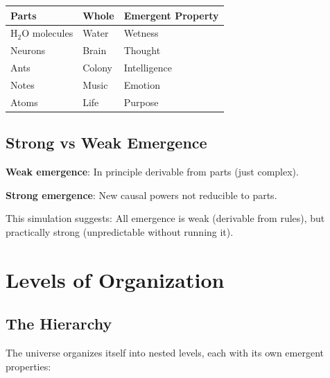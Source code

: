 \documentclass[
  11pt,
  letterpaper,
  twoside,
  openright]{book}
\begin{document}
\begin{longtable}[]{@{}lll@{}}
\toprule\noalign{}
Parts & Whole & Emergent Property \\
\midrule\noalign{}
\endhead
\bottomrule\noalign{}
\endlastfoot
\(\text{H}_2\text{O}\) molecules & Water & Wetness \\
Neurons & Brain & Thought \\
Ants & Colony & Intelligence \\
Notes & Music & Emotion \\
Atoms & Life & Purpose \\
\end{longtable}

\subsection{Strong vs Weak Emergence}\label{strong-vs-weak-emergence}

\textbf{Weak emergence}: In principle derivable from parts (just
complex).

\textbf{Strong emergence}: New causal powers not reducible to parts.

This simulation suggests: All emergence is weak (derivable from rules),
but practically strong (unpredictable without running it).

\section{Levels of Organization}\label{levels-of-organization}

\subsection{The Hierarchy}\label{the-hierarchy}

The universe organizes itself into nested levels, each with its own
emergent properties:
\end{document}
